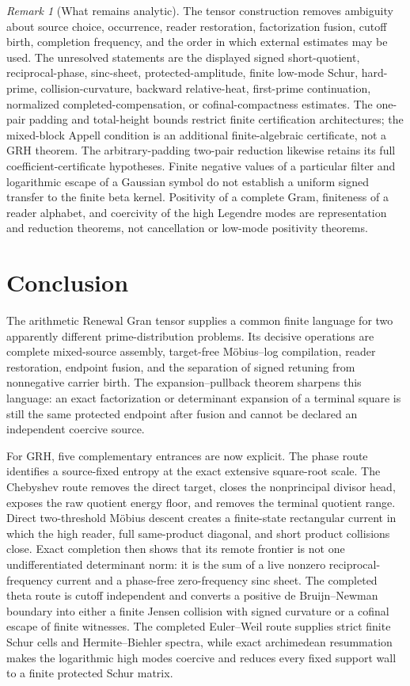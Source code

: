 \documentclass[11pt]{article}
\theoremstyle{definition}
\theoremstyle{remark}
\newtheorem{remark}[theorem]{Remark}
\begin{document}
\begin{remark}[What remains analytic]
The tensor construction removes ambiguity about source choice, occurrence,
reader restoration, factorization fusion, cutoff birth, completion frequency,
and the order in which external estimates may be used.  The unresolved
statements are the displayed signed short-quotient, reciprocal-phase,
sinc-sheet, protected-amplitude, finite low-mode Schur, hard-prime,
collision-curvature, backward relative-heat, first-prime continuation,
normalized completed-compensation, or cofinal-compactness estimates.  The one-pair padding and total-height bounds
restrict finite certification architectures; the mixed-block Appell condition
is an additional finite-algebraic certificate, not a GRH theorem.
The arbitrary-padding two-pair reduction likewise retains its full
coefficient-certificate hypotheses.  Finite negative values of a
particular filter and logarithmic escape of a Gaussian symbol do not
establish a uniform signed transfer to the finite beta kernel.
Positivity of a
complete Gram, finiteness of a reader alphabet, and coercivity of the high
Legendre modes are representation and reduction theorems, not cancellation or
low-mode positivity theorems.
\end{remark}

\section{Conclusion}
\label{sec:conclusion}

The arithmetic Renewal Gran tensor supplies a common finite language for two
apparently different prime-distribution problems.  Its decisive operations are
complete mixed-source assembly, target-free M\"obius--log compilation,
reader restoration, endpoint fusion, and the separation of signed retuning
from nonnegative carrier birth.  The expansion--pullback theorem sharpens this
language: an exact factorization or determinant expansion of a terminal square
is still the same protected endpoint after fusion and cannot be declared an
independent coercive source.

For GRH, five complementary entrances are now explicit.  The phase route
identifies a source-fixed entropy at the exact extensive square-root scale.
The Chebyshev route removes the direct target, closes the nonprincipal divisor
head, exposes the raw quotient energy floor, and removes the terminal quotient
range.  Direct two-threshold M\"obius descent creates a finite-state
rectangular current in which the high reader, full same-product diagonal, and
short product collisions close.  Exact completion then shows that its remote
frontier is not one undifferentiated determinant norm: it is the sum of a live
nonzero reciprocal-frequency current and a phase-free zero-frequency sinc
sheet.  The completed theta route is cutoff independent and converts a
positive de Bruijn--Newman boundary into either a finite Jensen collision with
signed curvature or a cofinal escape of finite witnesses.  The completed
Euler--Weil route supplies strict finite Schur cells and Hermite--Biehler
spectra, while exact archimedean resummation makes the logarithmic high modes
coercive and reduces every fixed support wall to a finite protected Schur
matrix.
\end{document}
